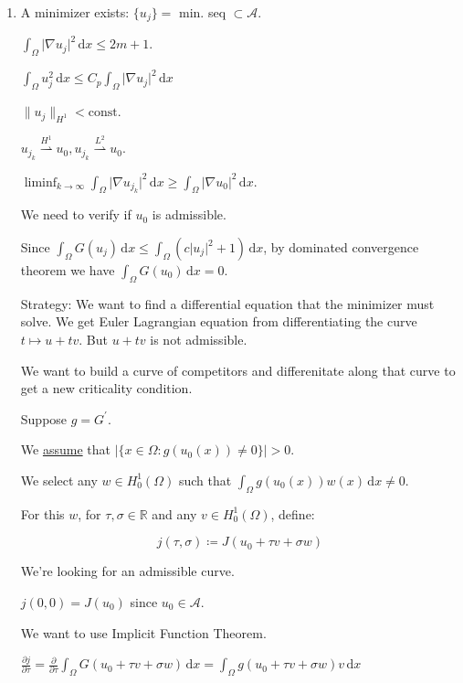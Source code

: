 \documentclass{article}
\theoremstyle{definition}
\begin{document}
\begin{enumerate}[label=\arabic*)]
    \item A minimizer exists: \(\{ u_j \} =\) min. seq \(\subset \mathcal{A}\).
    
    \(\int_{\Omega} \vert \nabla u_j \vert ^{2} \,\mathrm{d}x \leq 2m + 1\).

    \(\int_{\Omega} u_j ^{2} \,\mathrm{d}x \leq C_p \int_{\Omega} \vert \nabla u_j \vert ^{2} \,\mathrm{d}x\) 

    \(\lVert u_j \rVert _{H^1} < \text{const}\).
    
    \(u_{j_k} \overset{H^1}{\rightharpoonup} u_0, u_{j_k} \overset{L^2}{\rightharpoonup} u_0\).
    
    \(\liminf_{k \to \infty} \int_{\Omega} \vert \nabla u_{j_k} \vert ^ 2 \,\mathrm{d}x \geq \int_{\Omega} \vert \nabla u_0 \vert ^2 \,\mathrm{d}x \).

    We need to verify if \(u_0\) is admissible.

    Since \(\int_{\Omega} G(u_j) \,\mathrm{d}x \leq \int_{\Omega} (c \vert u_j \vert ^ 2 + 1) \,\mathrm{d}x\), by dominated convergence theorem we have \(\int_{\Omega} G(u_0) \,\mathrm{d}x = 0\).

    Strategy: We want to find a differential equation that the minimizer must solve. We get Euler Lagrangian equation from differentiating the curve \(t \mapsto u + tv\). But \(u+tv\) is not admissible.

    We want to build a curve of competitors and differenitate along that curve to get a new criticality condition.

    Suppose \(g = G^{\prime}\).

    We \underline{assume} that \(\vert \{ x\in \Omega : g(u_0(x)) \neq 0 \}  \vert > 0 \).
    
    We select any \(w\in H^1_0(\Omega)\) such that \(\int_{\Omega} g(u_0(x))w(x) \,\mathrm{d}x \neq 0\).

    For this \(w\), for \(\tau, \sigma \in \mathbb{R}\) and any \(v\in H^1_0(\Omega)\), define:

    \[
        j(\tau,\sigma) \coloneqq J(u_0+\tau v+\sigma w)
    \]

    We're looking for an admissible curve.

    \(j(0,0) = J(u_0)\) since \(u_0 \in \mathcal{A}\).

    We want to use Implicit Function Theorem.

    \(\frac{\partial j}{\partial \tau} = \frac{\partial}{\partial \tau} \int_{\Omega} G(u_0 + \tau v + \sigma w) \,\mathrm{d}x = \int_{\Omega} g(u_0 + \tau v + \sigma w) v \,\mathrm{d}x \) 


\end{enumerate}
\end{document}
